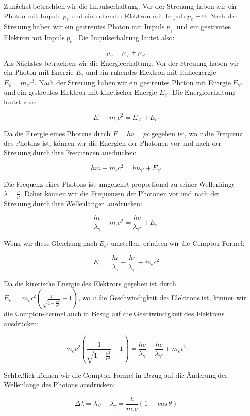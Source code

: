 \documentclass[12pt,a4paper,ngerman]{report}
\begin{document}
			Zunächst betrachten wir die Impulserhaltung. Vor der Streuung haben wir ein Photon mit Impuls $p_{\gamma}$ und ein ruhendes Elektron mit Impuls $p_e = 0$. Nach der Streuung haben wir ein gestreutes Photon mit Impuls $p_{\gamma'}$ und ein gestreutes Elektron mit Impuls $p_{e'}$. Die Impulserhaltung lautet also:

\[p_{\gamma} = p_{\gamma'} + p_{e'}\]
Als Nächstes betrachten wir die Energieerhaltung. Vor der Streuung haben wir ein Photon mit Energie $E_{\gamma}$ und ein ruhendes Elektron mit Ruheenergie $E_e = m_e c^2$. Nach der Streuung haben wir ein gestreutes Photon mit Energie $E_{\gamma'}$ und ein gestreutes Elektron mit kinetischer Energie $E_{e'}$. Die Energieerhaltung lautet also:

\[E_{\gamma} + m_e c^2 = E_{\gamma'} + E_{e'}\]

Da die Energie eines Photons durch $E = h \nu = p c$ gegeben ist, wo $\nu$ die Frequenz des Photons ist, können wir die Energien der Photonen vor und nach der Streuung durch ihre Frequenzen ausdrücken:

\[h \nu_{\gamma} + m_e c^2 = h \nu_{\gamma'} + E_{e'}\]

Die Frequenz eines Photons ist umgekehrt proportional zu seiner Wellenlänge $\lambda = \frac{c}{\nu}$. Daher können wir die Frequenzen der Photonen vor und nach der Streuung durch ihre Wellenlängen ausdrücken:

\[\frac{h c}{\lambda_{\gamma}} + m_e c^2 = \frac{h c}{\lambda_{\gamma'}} + E_{e'}\]

Wenn wir diese Gleichung nach $E_{e'}$ umstellen, erhalten wir die Compton-Formel:

\[E_{e'} = \frac{h c}{\lambda_{\gamma}} - \frac{h c}{\lambda_{\gamma'}} + m_e c^2\]

Da die kinetische Energie des Elektrons gegeben ist durch $E_{e'} = m_e c^2 \left(\frac{1}{\sqrt{1 - \frac{v^2}{c^2}}} - 1\right)$, wo $v$ die Geschwindigkeit des Elektrons ist, können wir die Compton-Formel auch in Bezug auf die Geschwindigkeit des Elektrons ausdrücken:

\[m_e c^2 \left(\frac{1}{\sqrt{1 - \frac{v^2}{c^2}}} - 1\right) = \frac{h c}{\lambda_{\gamma}} - \frac{h c}{\lambda_{\gamma'}} + m_e c^2\]

Schließlich können wir die Compton-Formel in Bezug auf die Änderung der Wellenlänge des Photons ausdrücken:

\[\Delta \lambda = \lambda_{\gamma'} - \lambda_{\gamma} = \frac{h}{m_e c} (1 - \cos \theta)\]
\end{document}
